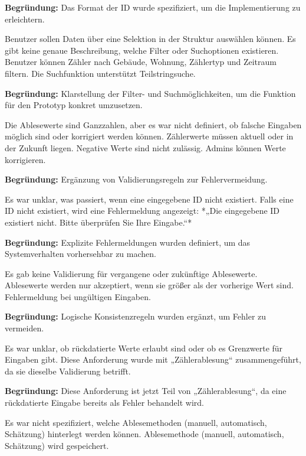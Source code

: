 \textbf{Begründung:}  
Das Format der ID wurde spezifiziert, um die Implementierung zu erleichtern.

{Benutzer sollen Daten über eine Selektion in der Struktur auswählen können. Es gibt keine genaue Beschreibung, welche Filter oder Suchoptionen existieren.}
{Benutzer können Zähler nach Gebäude, Wohnung, Zählertyp und Zeitraum filtern. Die Suchfunktion unterstützt Teilstringsuche.}

\textbf{Begründung:}  
Klarstellung der Filter- und Suchmöglichkeiten, um die Funktion für den Prototyp konkret umzusetzen.

{Die Ablesewerte sind Ganzzahlen, aber es war nicht definiert, ob falsche Eingaben möglich sind oder korrigiert werden können.}
{Zählerwerte müssen aktuell oder in der Zukunft liegen. Negative Werte sind nicht zulässig. Admins können Werte korrigieren.}

\textbf{Begründung:}  
Ergänzung von Validierungsregeln zur Fehlervermeidung.

{Es war unklar, was passiert, wenn eine eingegebene ID nicht existiert.}
{Falls eine ID nicht existiert, wird eine Fehlermeldung angezeigt: *„Die eingegebene ID existiert nicht. Bitte überprüfen Sie Ihre Eingabe.“*}

\textbf{Begründung:}  
Explizite Fehlermeldungen wurden definiert, um das Systemverhalten vorhersehbar zu machen.

{Es gab keine Validierung für vergangene oder zukünftige Ablesewerte.}
{Ablesewerte werden nur akzeptiert, wenn sie größer als der vorherige Wert sind. Fehlermeldung bei ungültigen Eingaben.}

\textbf{Begründung:}  
Logische Konsistenzregeln wurden ergänzt, um Fehler zu vermeiden.

{Es war unklar, ob rückdatierte Werte erlaubt sind oder ob es Grenzwerte für Eingaben gibt.}
{Diese Anforderung wurde mit „Zählerablesung“ zusammengeführt, da sie dieselbe Validierung betrifft.}

\textbf{Begründung:}  
Diese Anforderung ist jetzt Teil von „Zählerablesung“, da eine rückdatierte Eingabe bereits als Fehler behandelt wird.

{Es war nicht spezifiziert, welche Ablesemethoden (manuell, automatisch, Schätzung) hinterlegt werden können.}
{Ablesemethode (manuell, automatisch, Schätzung) wird gespeichert.}

